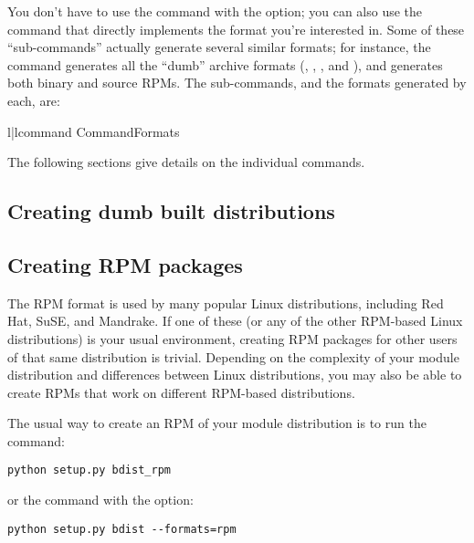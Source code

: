 \documentclass{howto}
\begin{document}
You don't have to use the  command with the
 option; you can also use the command that
directly implements the format you're interested in.  Some of these
 ``sub-commands'' actually generate several similar
formats; for instance, the  command generates all
the ``dumb'' archive formats (, , , and
), and  generates both binary and source
RPMs.  The  sub-commands, and the formats generated by
each, are:
\begin{tableii}{l|l}{command}%
  {Command}{Formats}
\end{tableii}

The following sections give details on the individual 
commands.


\subsection{Creating dumb built distributions}
\label{creating-dumb}



\subsection{Creating RPM packages}
\label{creating-rpms}

The RPM format is used by many popular Linux distributions, including
Red Hat, SuSE, and Mandrake.  If one of these (or any of the other
RPM-based Linux distributions) is your usual environment, creating RPM
packages for other users of that same distribution is trivial.
Depending on the complexity of your module distribution and differences
between Linux distributions, you may also be able to create RPMs that
work on different RPM-based distributions.

The usual way to create an RPM of your module distribution is to run the 
 command:

\begin{verbatim}
python setup.py bdist_rpm
\end{verbatim}

or the  command with the  option:

\begin{verbatim}
python setup.py bdist --formats=rpm
\end{verbatim}
\end{document}
